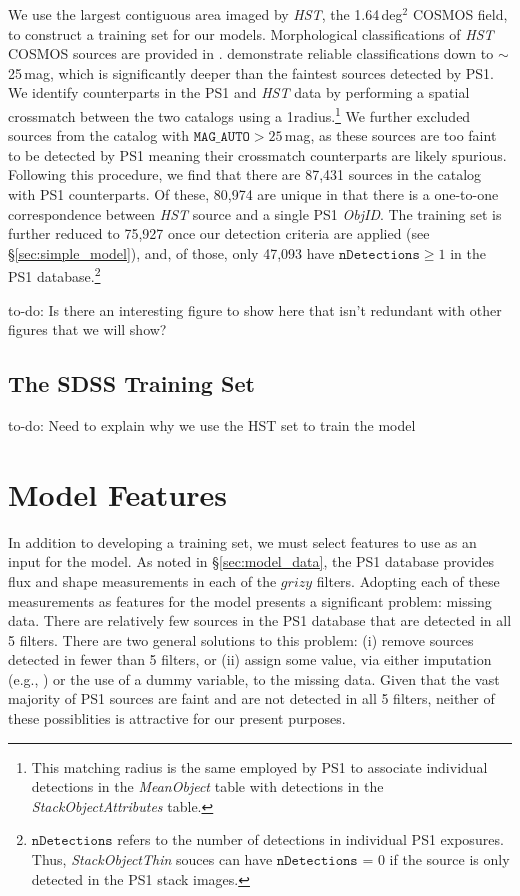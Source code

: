 \documentclass[twocolumn]{aastex62}
\newcommand{\todo}[1]{{\color{magenta} to-do: {#1}}}
\begin{document}
We use the largest contiguous area imaged by \textit{HST}, the 1.64\,deg$^2$
COSMOS field, to construct a training set for our models. Morphological
classifications of \textit{HST} COSMOS sources are provided in
\citet{Leauthaud07}. \citeauthor{Leauthaud07} demonstrate reliable
classifications down to $\sim$25\,mag, which is significantly deeper than the
faintest sources detected by PS1. We identify counterparts in the PS1 and
\textit{HST} data by performing a spatial crossmatch between the two catalogs
using a 1\arcsec radius.\footnote{This matching radius is the same employed by
PS1 to associate individual detections in the \textit{MeanObject} table with
detections in the \textit{StackObjectAttributes} table.} We further excluded
sources from the \citet{Leauthaud07} catalog with $\texttt{MAG\_AUTO} >
25$\,mag, as these sources are too faint to be detected by PS1 meaning their
crossmatch counterparts are likely spurious. Following this procedure, we find
that there are 87,431 sources in the \citet{Leauthaud07} catalog with PS1
counterparts. Of these, 80,974 are unique in that there is a one-to-one
correspondence between \textit{HST} source and a single PS1 \textit{ObjID}. The
training set is further reduced to 75,927 once our detection criteria are
applied (see \S\ref{sec:simple_model}), and, of those, only 47,093 have
$\texttt{nDetections} \ge 1$ in the PS1
database.\footnote{$\texttt{nDetections}$ refers to the number of detections in
individual PS1 exposures. Thus, \textit{StackObjectThin} souces can have
$\texttt{nDetections}$ = 0 if the source is only detected in the PS1 stack
images.}

\todo{Is there an interesting figure to show here that isn't redundant with other figures that we will show?}

\subsection{The SDSS Training Set}

\todo{Need to explain why we use the HST set to train the model}

\section{Model Features}\label{sec:model_features}

In addition to developing a training set, we must select features to use as an input for the model. As noted in \S\ref{sec:model_data}, the PS1 database provides flux and shape measurements in each of the $grizy$ filters. Adopting each of these measurements as features for the model presents a significant problem: missing data. There are relatively few sources in the PS1 database that are detected in all 5 filters. There are two general solutions to this problem: (i) remove sources detected in fewer than 5 filters, or (ii) assign some value, via either imputation (e.g., \citealt{Miller17}) or the use of a dummy variable, to the missing data. Given that the vast majority of PS1 sources are faint and are not detected in all 5 filters, neither of these possiblities is attractive for our present purposes.
\end{document}
